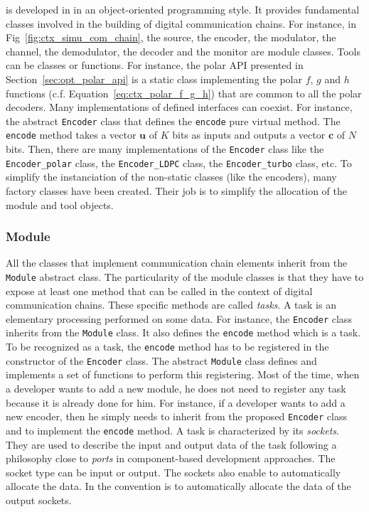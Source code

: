 \AFFECT is developed in \Cxx in an object-oriented programming style. It
provides fundamental classes involved in the building of digital communication
chains. For instance, in Fig~\ref{fig:ctx_simu_com_chain}, the source, the
encoder, the modulator, the channel, the demodulator, the decoder and the
monitor are module classes. Tools can be classes or functions. For instance, the
polar API presented in Section~\ref{sec:opt_polar_api} is a static class
implementing the polar $f$, $g$ and $h$ functions (c.f.
Equation~\ref{eq:ctx_polar_f_g_h}) that are common to all the polar decoders.
Many implementations of defined interfaces can coexist. For instance, the
abstract \verb|Encoder| class that defines the \verb|encode| pure virtual
method. The \verb|encode| method takes a vector $\bm{u}$ of $K$ bits as inputs
and outputs a vector $\bm{c}$ of $N$ bits. Then, there are many implementations
of the \verb|Encoder| class like the \verb|Encoder_polar| class, the
\verb|Encoder_LDPC| class, the \verb|Encoder_turbo| class, etc. To simplify the
instanciation of the non-static classes (like the encoders), many factory
classes have been created. Their job is to simplify the allocation of the module
and tool objects.

\subsubsection{Module}

All the classes that implement communication chain elements inherit from the
\verb|Module| abstract class. The particularity of the module classes is that
they have to expose at least one method that can be called in the context of
digital communication chains. These specific methods are called \emph{tasks}.
A task is an elementary processing performed on some data. For instance, the
\verb|Encoder| class inherits from the \verb|Module| class. It also defines the
\verb|encode| method which is a task. To be recognized as a task, the
\verb|encode| method has to be registered in the constructor of the
\verb|Encoder| class. The abstract \verb|Module| class defines and implements a
set of functions to perform this registering. Most of the time, when a developer
wants to add a new module, he does not need to register any task because it is
already done for him. For instance, if a developer wants to add a new encoder,
then he simply needs to inherit from the proposed \verb|Encoder| class and to
implement the \verb|encode| method. A task is characterized by its
\emph{sockets}. They are used to describe the input and output data of the task
following a philosophy close to \emph{ports} in component-based development
approaches. The socket type can be input or output. The sockets also enable to
automatically allocate the data. In \AFFECT the convention is to automatically
allocate the data of the output sockets.

